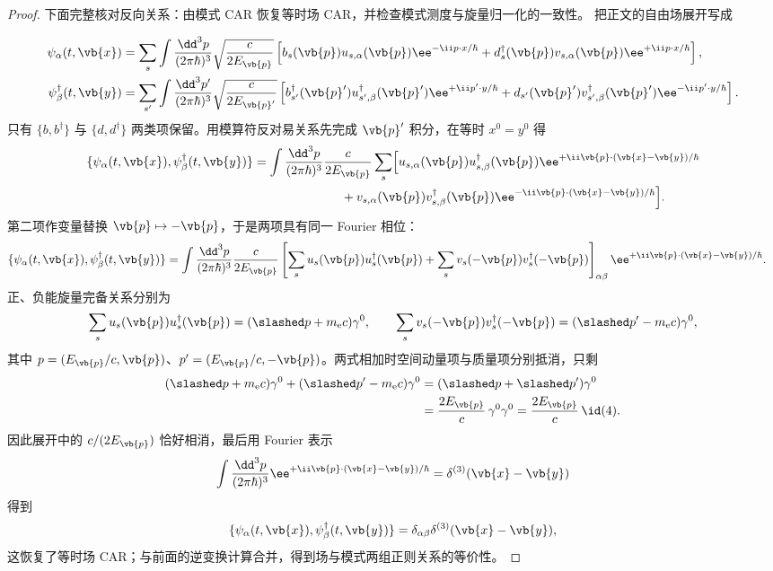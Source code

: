 \begin{proof}
下面完整核对反向关系：由模式 CAR 恢复等时场 CAR，并检查模式测度与旋量归一化的一致性。
把正文的自由场展开写成

\begin{align*}
\psi_\alpha(t,\vb{x})
&=\sum_s\int\frac{\dd^3 p}{(2\pi\hbar)^3}
\sqrt{\frac{c}{2E_{\vb{p}}}}
\left[
 b_s(\vb{p})u_{s,\alpha}(\vb{p})\ee^{-\ii p\cdot x/\hbar}
 +d_s^\dagger(\vb{p})v_{s,\alpha}(\vb{p})\ee^{+\ii p\cdot x/\hbar}
\right],\\
\psi_\beta^\dagger(t,\vb{y})
&=\sum_{s'}\int\frac{\dd^3 p'}{(2\pi\hbar)^3}
\sqrt{\frac{c}{2E_{\vb{p}'}}}
\left[
 b_{s'}^\dagger(\vb{p}')u_{s',\beta}^\dagger(\vb{p}')\ee^{+\ii p'\cdot y/\hbar}
 +d_{s'}(\vb{p}')v_{s',\beta}^\dagger(\vb{p}')\ee^{-\ii p'\cdot y/\hbar}
\right].
\end{align*}
只有 $\{b,b^\dagger\}$ 与 $\{d,d^\dagger\}$ 两类项保留。用模算符反对易关系先完成 $\vb{p}'$ 积分，在等时 $x^0=y^0$ 得
\begin{align*}
\{\psi_\alpha(t,\vb{x}),\psi_\beta^\dagger(t,\vb{y})\}
&=\int\frac{\dd^3 p}{(2\pi\hbar)^3}\frac{c}{2E_{\vb{p}}}
\sum_s\Bigl[
 u_{s,\alpha}(\vb{p})u_{s,\beta}^\dagger(\vb{p})\ee^{+\ii\vb{p}\cdot(\vb{x}-\vb{y})/\hbar}\\
&\hspace{7em}+v_{s,\alpha}(\vb{p})v_{s,\beta}^\dagger(\vb{p})\ee^{-\ii\vb{p}\cdot(\vb{x}-\vb{y})/\hbar}
\Bigr].
\end{align*}
第二项作变量替换 $\vb{p}\mapsto-\vb{p}$，于是两项具有同一 Fourier 相位：
\begin{align*}
\{\psi_\alpha(t,\vb{x}),\psi_\beta^\dagger(t,\vb{y})\}
&=\int\frac{\dd^3 p}{(2\pi\hbar)^3}\frac{c}{2E_{\vb{p}}}
\left[
\sum_su_s(\vb{p})u_s^\dagger(\vb{p})
+\sum_sv_s(-\vb{p})v_s^\dagger(-\vb{p})
\right]_{\alpha\beta}
 \ee^{+\ii\vb{p}\cdot(\vb{x}-\vb{y})/\hbar}.
\end{align*}
正、负能旋量完备关系分别为
\begin{equation*}
\sum_su_s(\vb{p})u_s^\dagger(\vb{p})=(\slashed p+m_{\mathrm e} c)\gamma^0,
\qquad
\sum_sv_s(-\vb{p})v_s^\dagger(-\vb{p})=(\slashed p'-m_{\mathrm e} c)\gamma^0,
\end{equation*}
其中 $p=(E_{\vb{p}}/c,\vb{p})$、$p'=(E_{\vb{p}}/c,-\vb{p})$。两式相加时空间动量项与质量项分别抵消，只剩
\begin{align*}
(\slashed p+m_{\mathrm e} c)\gamma^0+(\slashed p'-m_{\mathrm e} c)\gamma^0
&=(\slashed p+\slashed p')\gamma^0\\
&=\frac{2E_{\vb{p}}}{c}\,\gamma^0\gamma^0
=\frac{2E_{\vb{p}}}{c}\,\id(4).
\end{align*}
因此展开中的 $c/(2E_{\vb{p}})$ 恰好相消，最后用 Fourier 表示
\begin{equation*}
\int\frac{\dd^3 p}{(2\pi\hbar)^3}\ee^{+\ii\vb{p}\cdot(\vb{x}-\vb{y})/\hbar}
=\delta^{(3)}(\vb{x}-\vb{y})
\end{equation*}
得到
\begin{equation*}
\{\psi_\alpha(t,\vb{x}),\psi_\beta^\dagger(t,\vb{y})\}
=\delta_{\alpha\beta}\delta^{(3)}(\vb{x}-\vb{y}),
\end{equation*}
这恢复了等时场 CAR；与前面的逆变换计算合并，得到场与模式两组正则关系的等价性。
\end{proof}


